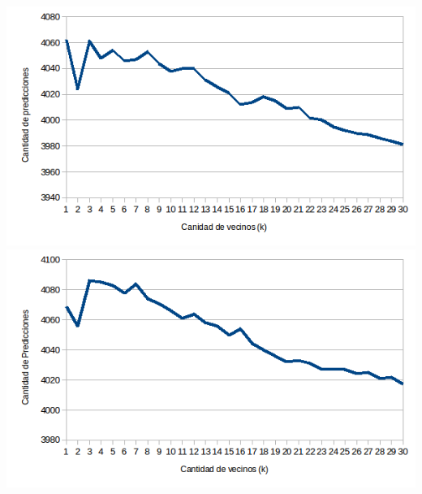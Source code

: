 \includegraphics[scale=0.55]{nuevosResultados/knn/2.png}\\

\includegraphics[scale=0.55]{nuevosResultados/knn/3.png}\\

